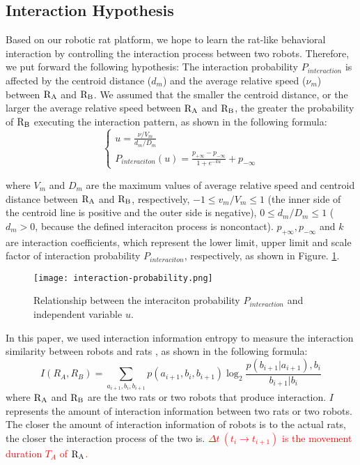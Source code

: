 \subsection{Interaction Hypothesis}
Based on our robotic rat platform, we hope to learn the rat-like behavioral interaction by controlling the interaction process between two robots. Therefore, we put forward the following hypothesis: The interaction probability $P_{interaction}$ is affected by the centroid distance ($d_m$) and the average relative speed ($\nu_m$) between $\rm R_A$ and $\rm R_B$. We assumed that the smaller the centroid distance, or the larger the average relative speed between $\rm R_A$ and $\rm R_B$, the greater the probability of $\rm R_B$ executing the interaction pattern, as shown in the following formula:
\begin{equation} \label{eq:probability of interaciton}
    \displaystyle\begin{cases}
        u=\displaystyle\frac{\nu/V_m}{d_m/D_m} \\
        P_{interaciton}(u)=\displaystyle\frac{p_{+\infty}-p_{-\infty}}{1+e^{-ku}}+p_{-\infty}
    \end{cases}
\end{equation}

where $V_m$ and $D_m$ are the maximum values of average relative speed and centroid distance between $\rm R_A$ and $\rm R_B$, respectively, $-1\leq v_m/V_m\leq 1$ (the inner side of the centroid line is positive and the outer side is negative), $0\leq d_m/D_m\leq 1$ ($d_m>0$, because the defined interaciton process is noncontact). $p_{+\infty},p_{-\infty}$ and $k$ are interaction coefficients, which represent the lower limit, upper limit and scale factor of interaction probability $P_{interaciton}$, respectively, as shown in Figure. \ref{figure:relationship between the interaciton probability and independent variable}.
\begin{figure}[h]
    \centering
    \texttt{[image: interaction-probability.png]}
    \caption{Relationship between the interaciton probability $P_{interaction}$ and independent variable $u$.}
    \label{figure:relationship between the interaciton probability and independent variable}
\end{figure}

In this paper, we used interaction information entropy to measure the interaction similarity between robots and rats \cite{lellis-feedback-control}, as shown in the following formula:
\begin{equation} \label{eq:interaction similarity}
    I(R_A,R_B)=\sum_{a_{i+1},b_i,b_{i+1}}p(a_{i+1},b_i,b_{i+1})\log_{2}\frac{p(b_{i+1}|a_{i+1}),b_{i}}{b_{i+1}|b_i}
\end{equation}
where $\rm R_A$ and $\rm R_B$ are the two rats or two robots that produce interaction. $I$ represents the amount of interaction information between two rats or two robots. The closer the amount of interaction information of robots is to the actual rats, the closer the interaction process of the two is. \textcolor{red}{$\Delta t~(t_i\rightarrow t_{i+1})$ is the movement duration $T_A$ of $\rm R_A$.}

